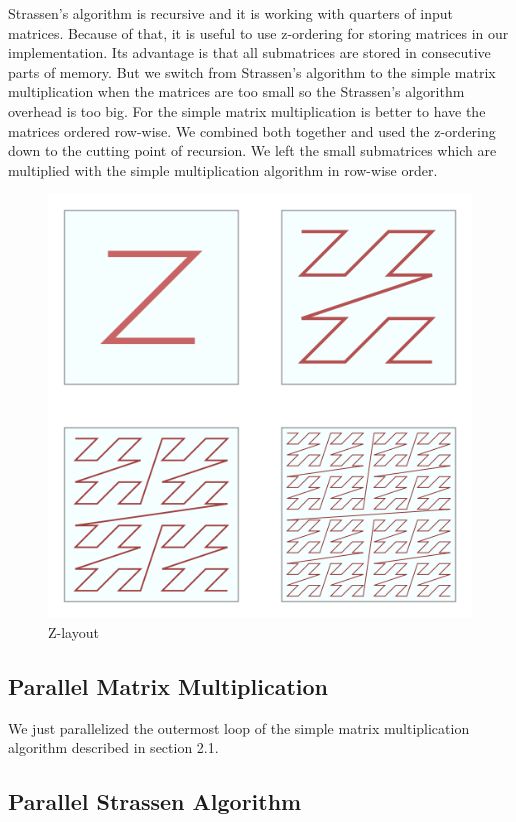 \documentclass{article}
\begin{document}
Strassen’s algorithm is recursive and it is working with quarters of input matrices.
Because of that, it is useful to use z-ordering for storing matrices in our implementation.
Its advantage is that all submatrices are stored in consecutive parts of memory.
But we switch from Strassen’s algorithm to the simple matrix multiplication
when the matrices are too small so the Strassen’s algorithm overhead is too big.
For the simple matrix multiplication is better to have the matrices ordered row-wise.
We combined both together and used the z-ordering down to the cutting point of recursion.
We left the small submatrices which are multiplied with the simple multiplication algorithm
in row-wise order.

\begin{figure}[htbp]
\centerline{\includegraphics[scale=.2]{morton_order.png}}
\caption{Z-layout}
\label{fig}
\end{figure}

\subsection{Parallel Matrix Multiplication}
We just parallelized the outermost loop of the simple matrix multiplication algorithm
described in section 2.1.

\subsection{Parallel Strassen Algorithm}
\end{document}
